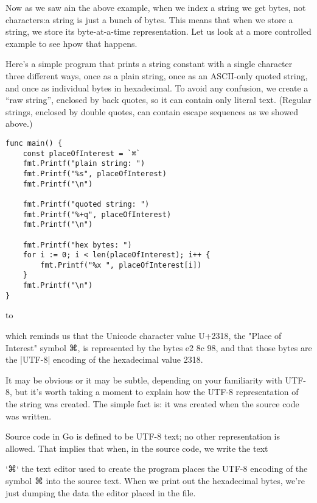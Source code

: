 Now as we saw ain the above example, when we index a string we get bytes, not characters:a string
is just a bunch of bytes. This means that when we store a string, we store its byte-at-a-time representation. Let us look at a more controlled example to see hpow that happens.

Here's a simple program that prints a string constant with a single character three different ways, once as a plain string, once as an ASCII-only quoted string, and once as individual bytes in hexadecimal. To avoid any confusion, we create a \enquote{raw string}, enclosed by back quotes, so it can contain only literal text. (Regular strings, enclosed by double quotes, can contain escape sequences as we showed above.)

\begin{verbatim}
func main() {
    const placeOfInterest = `⌘`
    fmt.Printf("plain string: ")
    fmt.Printf("%s", placeOfInterest)
    fmt.Printf("\n")

    fmt.Printf("quoted string: ")
    fmt.Printf("%+q", placeOfInterest)
    fmt.Printf("\n")

    fmt.Printf("hex bytes: ")
    for i := 0; i < len(placeOfInterest); i++ {
        fmt.Printf("%x ", placeOfInterest[i])
    }
    fmt.Printf("\n")
}
\end{verbatim}
\hbox to 



\noindent which reminds us that the Unicode character value U+2318, the "Place of Interest" symbol {\panunicode ⌘}, is represented by the bytes e2 8c 98, and that those bytes are the |UTF-8| encoding of the hexadecimal value 2318.

It may be obvious or it may be subtle, depending on your familiarity with UTF-8, but it's worth taking a moment to explain how the UTF-8 representation of the string was created. The simple fact is: it was created when the source code was written.

Source code in Go is defined to be UTF-8 text; no other representation is allowed. That implies that when, in the source code, we write the text

`⌘`
the text editor used to create the program places the UTF-8 encoding of the symbol ⌘ into the source text. When we print out the hexadecimal bytes, we're just dumping the data the editor placed in the file.

